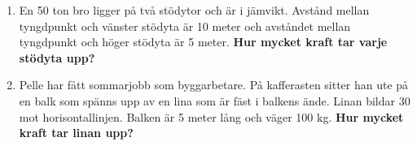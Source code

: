 \documentclass[11pt]{article}
\begin{document}
\begin{enumerate}[itemsep=2em]
        \item
              En 50 ton bro ligger på två stödytor och är i jämvikt.  Avstånd mellan tyngdpunkt och vänster stödyta är 10 meter och avståndet mellan tyngdpunkt och höger stödyta är 5 meter.
              \textbf{Hur mycket kraft tar varje stödyta upp?}
              \begin{center}
                      
              \end{center}

        \item
        Pelle har fått sommarjobb som byggarbetare. På kafferasten sitter han ute på en balk som spänns upp av en lina som är fäst i balkens ände. Linan bildar 30\degree{} mot horisontallinjen. Balken är 5 meter lång och väger 100 kg. \textbf{Hur mycket kraft tar linan upp?}
        \begin{center}
                
        \end{center}

\end{enumerate}

\newpage
\end{document}
